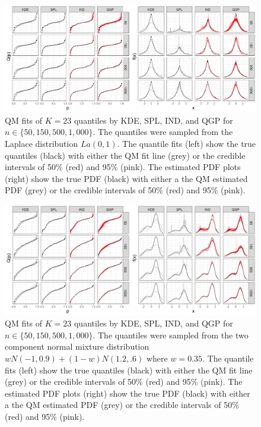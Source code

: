 \documentclass[preprint,12pt,authoryear]{elsarticle}
\begin{document}
\begin{figure}[hbt!]
\centering
  \centering
  \includegraphics[width=1.3\linewidth]{Images/quants_dens_la.png}

\caption{QM fits of $K=23$ quantiles by KDE, SPL, IND, and QGP for $n \in \{50, 150, 500, 1{,}000\}$. The quantiles were sampled from the Laplace distribution $La(0,1)$. The quantile fits (left) show the true quantiles (black) with either the QM fit line (grey) or the credible intervals of 50\% (red) and 95\% (pink). 
The estimated PDF plots (right) show the true PDF (black) with either a the QM estimated PDF (grey) or the credible intervals of 50\% (red) and 95\% (pink).}
\label{fig:lp_fits}
\end{figure}


\begin{figure}[hbt!]
\centering
  \centering
  \includegraphics[width=1.3\linewidth]{Images/quants_dens_gmix.png}
\caption{QM fits of $K=23$ quantiles by KDE, SPL, IND, and QGP for $n \in \{50, 150, 500, 1{,}000\}$. The quantiles were sampled from the two component normal mixture distribution $w N(-1, 0.9) + (1-w)N(1.2, .6)$ where $w = 0.35$. The quantile fits (left) show the true quantiles (black) with either the QM fit line (grey) or the credible intervals of 50\% (red) and 95\% (pink). 
The estimated PDF plots (right) show the true PDF (black) with either a the QM estimated PDF (grey) or the credible intervals of 50\% (red) and 95\% (pink). }
\label{fig:gmix_fits}
\end{figure}
\end{document}
